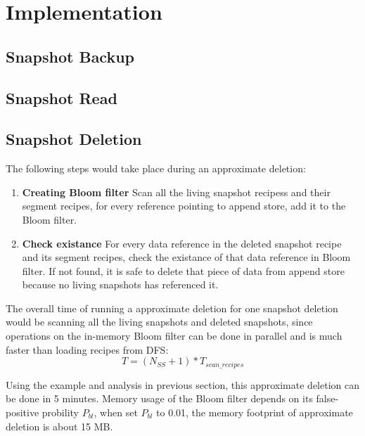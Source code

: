 \section{Implementation}
\subsection{Snapshot Backup}
\subsection{Snapshot Read}
\subsection{Snapshot Deletion}
The following steps would take place during an approximate deletion:

\begin{enumerate}
\item {\bf Creating Bloom filter} Scan all the living snapshot recipess and their segment recipes,
for every reference pointing to append store, add it to the Bloom filter.
\item {\bf Check existance} For every data reference in the deleted snapshot recipe and its segment recipes,
check the existance of that data reference in Bloom filter. If not found, it is safe to delete that piece of data from append store
because no living snapshots has referenced it.
\end{enumerate}

The overall time of running a approximate deletion for one snapshot deletion would be scanning
all the living snapshots and deleted snapshots, since operations on the in-memory Bloom filter can be done in
parallel and is much faster than loading recipes from DFS:
\begin{equation}
T = (N_{SS} + 1) * T_{scan\_recipes}
\end{equation}
 
Using the example and analysis in previous section, this approximate deletion can be done in 5 minutes. 
Memory usage of the Bloom filter depends on its false-positive probility $P_{bl}$,
when set $P_{bl}$ to 0.01, the memory footprint of approximate deletion is about 15 MB.
